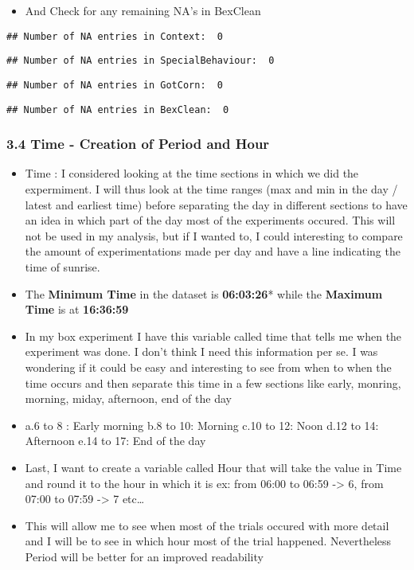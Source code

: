 \documentclass[
]{article}
\providecommand{\tightlist}{%
  \setlength{\itemsep}{0pt}\setlength{\parskip}{0pt}}
\begin{document}
\begin{itemize}
\tightlist
\item
  And Check for any remaining NA's in BexClean
\end{itemize}

\begin{verbatim}
## Number of NA entries in Context:  0
\end{verbatim}

\begin{verbatim}
## Number of NA entries in SpecialBehaviour:  0
\end{verbatim}

\begin{verbatim}
## Number of NA entries in GotCorn:  0
\end{verbatim}

\begin{verbatim}
## Number of NA entries in BexClean:  0
\end{verbatim}

\hypertarget{time---creation-of-period-and-hour}{%
\subsubsection{3.4 Time - Creation of Period and
Hour}\label{time---creation-of-period-and-hour}}

\begin{itemize}
\item
  Time : I considered looking at the time sections in which we did the
  expermiment. I will thus look at the time ranges (max and min in the
  day / latest and earliest time) before separating the day in different
  sections to have an idea in which part of the day most of the
  experiments occured. This will not be used in my analysis, but if I
  wanted to, I could interesting to compare the amount of
  experimentations made per day and have a line indicating the time of
  sunrise.
\item
  The \textbf{Minimum Time} in the dataset is \textbf{06:03:26}* while
  the \textbf{Maximum Time} is at \textbf{16:36:59}
\item
  In my box experiment I have this variable called time that tells me
  when the experiment was done. I don't think I need this information
  per se. I was wondering if it could be easy and interesting to see
  from when to when the time occurs and then separate this time in a few
  sections like early, monring, morning, miday, afternoon, end of the
  day
\item
  a.6 to 8 : Early morning b.8 to 10: Morning c.10 to 12: Noon d.12 to
  14: Afternoon e.14 to 17: End of the day
\item
  Last, I want to create a variable called Hour that will take the value
  in Time and round it to the hour in which it is ex: from 06:00 to
  06:59 -\textgreater{} 6, from 07:00 to 07:59 -\textgreater{} 7
  etc\ldots{}
\item
  This will allow me to see when most of the trials occured with more
  detail and I will be to see in which hour most of the trial happened.
  Nevertheless Period will be better for an improved readability
\end{itemize}
\end{document}
